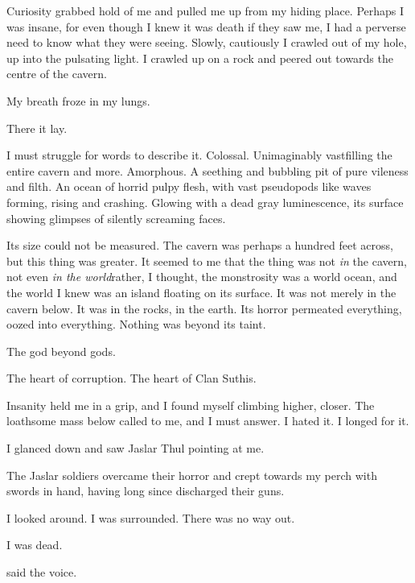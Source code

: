 \documentclass
  [a4paper,
   12pt,
   oneside
  ]%
  {article}
\begin{document}
Curiosity grabbed hold of me and pulled me up from my hiding place. 
Perhaps I was insane, for even though I knew it was death if they saw me, I had a perverse need to know what they were seeing. 
Slowly, cautiously I crawled out of my hole, up into the pulsating light. 
I crawled up on a rock and peered out towards the centre of the cavern.

My breath froze in my lungs. 

There it lay. 

I must struggle for words to describe it. 
Colossal. 
Unimaginably vast\dash filling the entire cavern and more. 
Amorphous. 
A seething and bubbling pit of pure vileness and filth. 
An ocean of horrid pulpy flesh, with vast pseudopods like waves forming, rising and crashing. 
Glowing with a dead gray luminescence, its surface showing glimpses of silently screaming faces. 

Its size could not be measured. 
The cavern was perhaps a hundred feet across, but this thing was greater. 
It seemed to me that the thing was not \emph{in} the cavern, not even \emph{in the world}\dash rather, I thought, the monstrosity was a world ocean, and the world I knew was an island floating on its surface.
It was not merely in the cavern below. 
It was in the rocks, in the earth. 
Its horror permeated everything, oozed into everything. 
Nothing was beyond its taint. 

The god beyond gods. 

The heart of corruption. 
The heart of Clan Suthis. 


Insanity held me in a grip, and I found myself climbing higher, closer. 
The loathsome mass below called to me, and I must answer.
I hated it. 
I longed for it. 


I glanced down and saw Jaslar Thul pointing at me.


The Jaslar soldiers overcame their horror and crept towards my perch with swords in hand, having long since discharged their guns. 

I looked around. 
I was surrounded. 
There was no way out.

I was dead. 

 said the voice.
\end{document}
